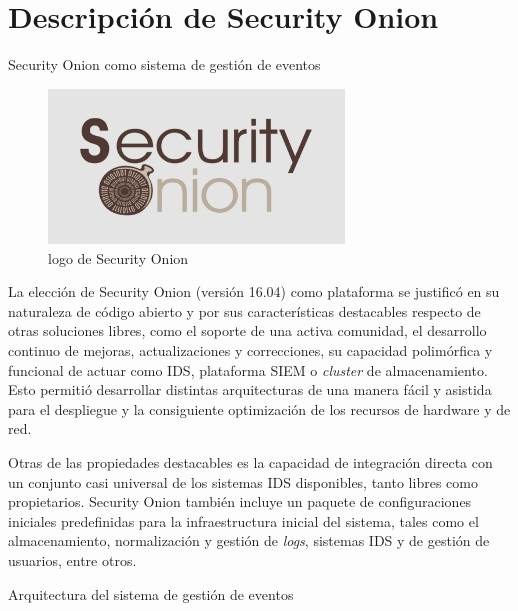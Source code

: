 \chapter{\Large Descripción de Security Onion}
    \begin{section}{Security Onion como sistema de gestión de eventos}
    \begin{figure}[H]
        \centering
        \includegraphics[width=0.7\textwidth]{./descripcion_sonion_imagenes/figura_15_logo_sonion.png}
        \caption{logo de Security Onion\cite{sonion}}
        \label{fig:logo_sonion}
    \end{figure}
        La elección de Security Onion (versión 16.04) como plataforma se justificó en su naturaleza de código abierto y por sus características destacables respecto de otras soluciones libres, como el soporte de una activa comunidad, el desarrollo continuo de mejoras, actualizaciones y correcciones, su capacidad polimórfica y funcional de actuar como IDS, plataforma SIEM o \textit{cluster} de almacenamiento. Esto permitió desarrollar distintas arquitecturas de una manera fácil y asistida para el despliegue y la consiguiente optimización de los recursos de hardware y de red. \par
        Otras de las propiedades destacables es la capacidad de integración directa con un conjunto casi universal de los sistemas IDS disponibles, tanto libres como propietarios. Security Onion también incluye un paquete de configuraciones iniciales predefinidas para la infraestructura inicial del sistema, tales como el almacenamiento, normalización y gestión de \textit{logs}, sistemas IDS y de gestión de usuarios, entre otros. \par
    \end{section}
    \begin{section}{Arquitectura del sistema de gestión de eventos}
    \end{section}
